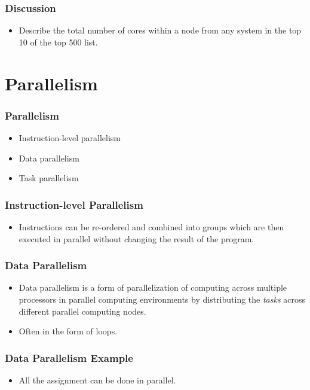 \documentclass{beamer}
\begin{document}
\begin{CJK}{UTF8}{bsmi}
\begin{frame}
\frametitle{Discussion} 
\begin{itemize}
\item Describe the total number of cores within a node from any
  system in the top 10 of the top 500 list.
\end{itemize}
\end{frame}


\section{Parallelism}

\begin{frame}
\frametitle{Parallelism} 
\begin{itemize}
\item Instruction-level parallelism
\item Data parallelism
\item Task parallelism
\end{itemize}
\end{frame}

\begin{frame}
\frametitle{Instruction-level Parallelism} 
\begin{itemize}
\item Instructions can be re-ordered and combined into groups which
  are then executed in parallel without changing the result of the
  program.
\end{itemize}
\end{frame}

\begin{frame}
\frametitle{Data Parallelism}
\begin{itemize}
\item Data parallelism is a form of parallelization of computing
  across multiple processors in parallel computing environments by
  distributing the {\em tasks} across different parallel computing
  nodes.
\item Often in the form of loops.
\end{itemize}
\end{frame}

\begin{frame}
\frametitle{Data Parallelism Example}
\begin{itemize}
\item All the assignment can be done in parallel.
\end{itemize}
\end{frame}


\end{CJK}
\end{document}
